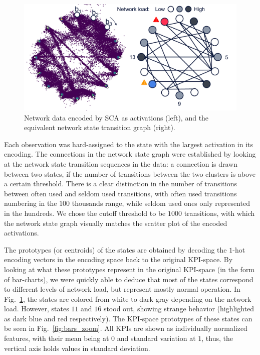 			\begin{figure}[ht]
				\centering
				\includegraphics[width=\linewidth]{figures/06_sparse_clust/graph_scatter/graph_scatter.pdf}
				\caption[Network data as a state transition graph]{Network data encoded by SCA as activations (left), and the equivalent network state transition graph (right).}
				\label{fig:graph_scatter}
			\end{figure}
			
			Each observation was hard-assigned to the state with the largest activation in its encoding.
			The connections in the network state graph were established by looking at the network state transition sequences in the data: a connection is drawn between two states, if the number of transitions between the two clusters is above a certain threshold.
			There is a clear distinction in the number of transitions between often used and seldom used transitions, with often used transitions numbering in the $100$ thousands range, while seldom used ones only represented in the hundreds.
			We chose the cutoff threshold to be $1000$ transitions, with which the network state graph visually matches the scatter plot of the encoded activations.
			
			The prototypes (or centroids) of the states are obtained by decoding the $1$-hot encoding vectors in the encoding space back to the original \ac{KPI}-space.
			By looking at what these prototypes represent in the original \ac{KPI}-space (in the form of bar-charts), we were quickly able to deduce that most of the states correspond to different levels of network load, but represent mostly normal operation.
			In Fig.~\ref{fig:graph_scatter}, the states are colored from white to dark gray depending on the network load.
			However, states $11$ and $16$ stood out, showing strange behavior (highlighted as dark blue and red respectively).
			The \ac{KPI}-space prototypes of these states can be seen in Fig.~\ref{fig:bars_zoom}.
			All \acp{KPI} are shown as individually normalized features, with their mean being at $0$ and standard variation at $1$, thus, the vertical axis holds values in standard deviation.
			
